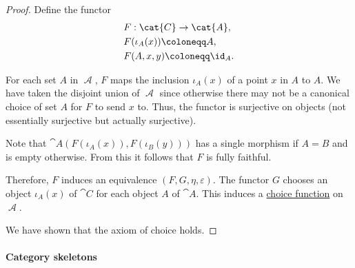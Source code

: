 \begin{proof}
  Define the functor
  \begin{equation*}
    \begin{aligned}
      &F: \cat{C} \to \cat{A}, \\
      &F(\iota_A(x)) \coloneqq A, \\
      &F(A, x, y) \coloneqq \id_A.
    \end{aligned}
  \end{equation*}

  For each set \( A \) in \( \mscrA \), \( F \) maps the inclusion \( \iota_A(x) \) of a point \( x \) in \( A \) to \( A \). We have taken the disjoint union of \( \mscrA \) since otherwise there may not be a canonical choice of set \( A \) for \( F \) to send \( x \) to. Thus, the functor is surjective on objects (not essentially surjective but actually surjective).

  Note that \( \cat{A}(F(\iota_A(x)), F(\iota_B(y))) \) has a single morphism if \( A = B \) and is empty otherwise. From this it follows that \( F \) is fully faithful.

  Therefore, \( F \) induces an equivalence \( (F, G, \eta, \varepsilon) \). The functor \( G \) chooses an object \( \iota_A(x) \) of \( \cat{C} \) for each object \( A \) of \( \cat{A} \). This induces a \hyperref[def:choice_function]{choice function} on \( \mscrA \).

  We have shown that the axiom of choice holds.
\end{proof}

\paragraph{Category skeletons}

